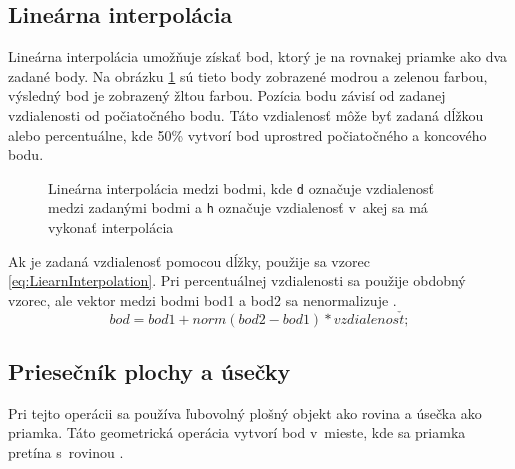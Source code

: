 \subsection*{Lineárna interpolácia}
Lineárna interpolácia umožňuje získať bod, ktorý je na rovnakej priamke ako dva zadané body. Na obrázku \ref{fig:PointLinearInterpolation} sú tieto body zobrazené modrou a zelenou farbou, výsledný bod je zobrazený žltou farbou. Pozícia bodu závisí od zadanej vzdia\-le\-nos\-ti od počiatočného bodu. Táto vzdia\-le\-nosť môže byť zadaná dĺžkou alebo percentuálne, kde 50\% vytvorí bod uprostred počiatočného a koncového bodu. 
\begin{figure}[H]
	\centering
	\caption{Lineárna interpolácia medzi bodmi, kde \texttt{d} označuje vzdialenosť medzi zadanými bodmi a  \texttt{h} označuje vzdialenosť v~akej sa má vykonať interpolácia }
	\label{fig:PointLinearInterpolation}
\end{figure}
Ak je zadaná vzdialenosť pomocou dĺžky, použije sa vzorec \ref{eq:LiearnInterpolation}. Pri percentuálnej vzdialenosti sa použije obdobný vzorec, ale vektor medzi bodmi bod1 a bod2 sa nenormalizuje \cite{modernipocitacovagrafika}. 
\begin{equation}
    bod = bod1 + norm(bod2 - bod1) * vzdialenos\check{t};
	\label{eq:LiearnInterpolation}
\end{equation}


\subsection*{Priesečník plochy a úsečky}

Pri tejto operácii sa používa ľubovolný plošný objekt ako rovina a úsečka ako priamka. Táto geometrická operácia vytvorí bod v~mieste, kde sa priamka pretína s~rovinou \cite{bourke_Point_Line_Plane}. 


